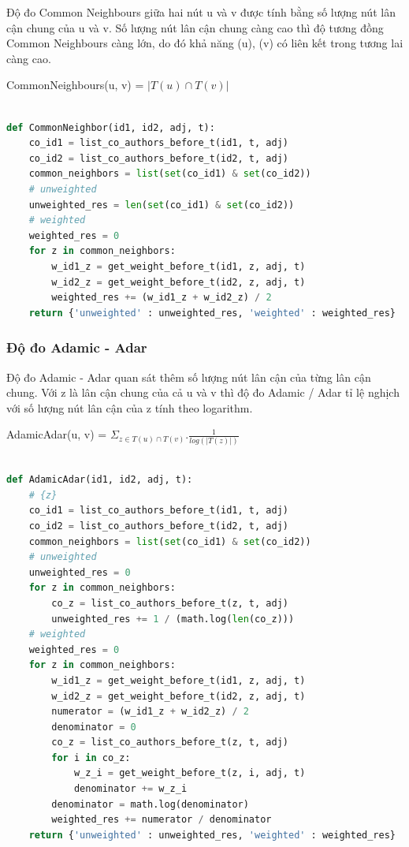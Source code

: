 \documentclass{article}
\begin{document}
Độ đo Common Neighbours giữa hai nút u và v được tính bằng số lượng nút lân cận chung của u và v. Số lượng nút lân cận chung càng cao thì độ tương đồng Common Neighbours càng lớn, do đó khả năng (u), (v) có liên kết trong tương lai càng cao. 

\begin{center}
 CommonNeighbours(u, v) =  $|T(u) \cap T(v)|$
\end{center}


\begin{lstlisting}[language=Python, caption=Độ đo Common Neighbours]

def CommonNeighbor(id1, id2, adj, t):
    co_id1 = list_co_authors_before_t(id1, t, adj)
    co_id2 = list_co_authors_before_t(id2, t, adj)
    common_neighbors = list(set(co_id1) & set(co_id2))
    # unweighted
    unweighted_res = len(set(co_id1) & set(co_id2))
    # weighted
    weighted_res = 0
    for z in common_neighbors:
        w_id1_z = get_weight_before_t(id1, z, adj, t)
        w_id2_z = get_weight_before_t(id2, z, adj, t)
        weighted_res += (w_id1_z + w_id2_z) / 2
    return {'unweighted' : unweighted_res, 'weighted' : weighted_res}


\end{lstlisting}

\subsubsection{Độ đo Adamic - Adar}

Độ đo Adamic - Adar quan sát thêm số lượng nút lân cận của từng lân cận chung. Với z là lân cận chung của cả u và v thì độ đo Adamic / Adar tỉ lệ  nghịch với số lượng nút lân cận của z tính theo logarithm. 

\begin{center}
AdamicAdar(u, v) = $\Sigma_{z \in T(u) \cap T(v)} . \frac{1}{log(|T(z)|)}$
\end{center}

\begin{lstlisting}[language=Python, caption=Độ đo Adamic - Adar]

def AdamicAdar(id1, id2, adj, t):
    # {z}
    co_id1 = list_co_authors_before_t(id1, t, adj)
    co_id2 = list_co_authors_before_t(id2, t, adj)
    common_neighbors = list(set(co_id1) & set(co_id2))
    # unweighted
    unweighted_res = 0
    for z in common_neighbors:
        co_z = list_co_authors_before_t(z, t, adj)
        unweighted_res += 1 / (math.log(len(co_z)))
    # weighted
    weighted_res = 0
    for z in common_neighbors:
        w_id1_z = get_weight_before_t(id1, z, adj, t)
        w_id2_z = get_weight_before_t(id2, z, adj, t)
        numerator = (w_id1_z + w_id2_z) / 2
        denominator = 0
        co_z = list_co_authors_before_t(z, t, adj)
        for i in co_z:
            w_z_i = get_weight_before_t(z, i, adj, t)
            denominator += w_z_i
        denominator = math.log(denominator)
        weighted_res += numerator / denominator
    return {'unweighted' : unweighted_res, 'weighted' : weighted_res}

\end{lstlisting}
\end{document}
